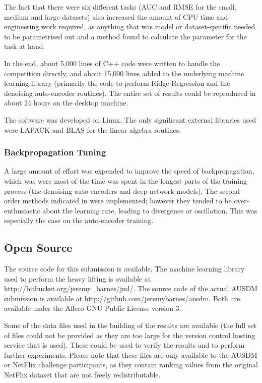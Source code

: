 \documentclass{article}
\begin{document}
The fact that there were six different tasks (AUC and RMSE for the small, medium and large datasets) also increased the amount of CPU time and engineering work required, as anything that was model or dataset-specific needed to be parametrised out and a method found to calculate the parameter for the task at hand.

In the end, about 5,000 lines of C++ code were written to handle the competition directly, and about 15,000 lines added to the underlying machine learning library (primarily the code to perform Ridge Regression and the denoising auto-encoder routines).  The entire set of results could be reproduced in about 24 hours on the desktop machine.

The software was developed on Linux.  The only significant external libraries used were LAPACK and BLAS for the linear algebra routines.

\subsubsection{Backpropagation Tuning}

A large amount of effort was expended to improve the speed of backpropagation, which was were most of the time was spent in the longest parts of the training process (the denoising auto-encoders and deep network models).  The second-order methods indicated in \cite{lecun-98b} were implemented; however they tended to be over-enthusiastic about the learning rate, leading to divergence or oscillation.  This was especially the case on the auto-encoder training.

\subsection{Open Source}

The source code for this submission is available.  The machine learning library used to perform the heavy lifting is available at http://bitbucket.org/jeremy\_barnes/jml/.  The source code of the actual AUSDM submission is available at http://github.com/jeremybarnes/ausdm.  Both are available under the Affero GNU Public License version 3.

Some of the data files used in the building of the results are available (the full set of files could not be provided as they are too large for the version control hosting service that is used).  These could be used to verify the results and to perform further experiments.  Please note that these files are only available to the AUSDM or NetFlix challenge participants, as they contain ranking values from the original NetFlix dataset that are not freely redistributable.
\end{document}
